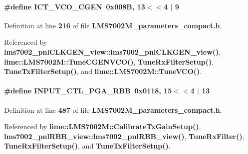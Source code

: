 \paragraph[{I\+C\+T\+\_\+\+V\+C\+O\+\_\+\+C\+G\+EN}]{\setlength{\rightskip}{0pt plus 5cm}\#define I\+C\+T\+\_\+\+V\+C\+O\+\_\+\+C\+G\+EN~0x008\+B, 13$<$$<$4 $\vert$  9}\label{LMS7002M__parameters__compact_8h_ae11fb59613f8a576109c475f80ee03b6}


Definition at line {\bf 216} of file {\bf L\+M\+S7002\+M\+\_\+parameters\+\_\+compact.\+h}.



Referenced by {\bf lms7002\+\_\+pnl\+C\+L\+K\+G\+E\+N\+\_\+view\+::lms7002\+\_\+pnl\+C\+L\+K\+G\+E\+N\+\_\+view()}, {\bf lime\+::\+L\+M\+S7002\+M\+::\+Tune\+C\+G\+E\+N\+V\+C\+O()}, {\bf Tune\+Rx\+Filter\+Setup()}, {\bf Tune\+Tx\+Filter\+Setup()}, and {\bf lime\+::\+L\+M\+S7002\+M\+::\+Tune\+V\+C\+O()}.

\paragraph[{I\+N\+P\+U\+T\+\_\+\+C\+T\+L\+\_\+\+P\+G\+A\+\_\+\+R\+BB}]{\setlength{\rightskip}{0pt plus 5cm}\#define I\+N\+P\+U\+T\+\_\+\+C\+T\+L\+\_\+\+P\+G\+A\+\_\+\+R\+BB~0x0118, 15$<$$<$4 $\vert$  13}\label{LMS7002M__parameters__compact_8h_ab2d94cb8ee56a77b0bd05733037536be}


Definition at line {\bf 487} of file {\bf L\+M\+S7002\+M\+\_\+parameters\+\_\+compact.\+h}.



Referenced by {\bf lime\+::\+L\+M\+S7002\+M\+::\+Calibrate\+Tx\+Gain\+Setup()}, {\bf lms7002\+\_\+pnl\+R\+B\+B\+\_\+view\+::lms7002\+\_\+pnl\+R\+B\+B\+\_\+view()}, {\bf Tune\+Rx\+Filter()}, {\bf Tune\+Rx\+Filter\+Setup()}, and {\bf Tune\+Tx\+Filter\+Setup()}.

